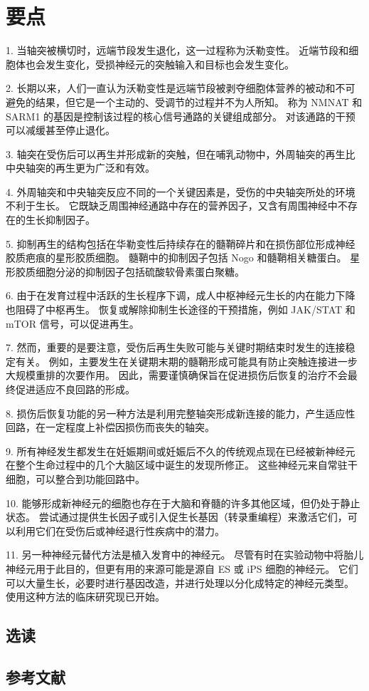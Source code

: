 \section{要点}

1. 当轴突被横切时，远端节段发生退化，这一过程称为沃勒变性。 近端节段和细胞体也会发生变化，受损神经元的突触输入和目标也会发生变化。 

2. 长期以来，人们一直认为沃勒变性是远端节段被剥夺细胞体营养的被动和不可避免的结果，但它是一个主动的、受调节的过程并不为人所知。 称为 NMNAT 和 SARM1 的基因是控制该过程的核心信号通路的关键组成部分。 对该通路的干预可以减缓甚至停止退化。 

3. 轴突在受伤后可以再生并形成新的突触，但在哺乳动物中，外周轴突的再生比中央轴突的再生更为广泛和有效。 

4. 外周轴突和中央轴突反应不同的一个关键因素是，受伤的中央轴突所处的环境不利于生长。 它既缺乏周围神经通路中存在的营养因子，又含有周围神经中不存在的生长抑制因子。 

5. 抑制再生的结构包括在华勒变性后持续存在的髓鞘碎片和在损伤部位形成神经胶质疤痕的星形胶质细胞。 髓鞘中的抑制因子包括 Nogo 和髓鞘相关糖蛋白。 星形胶质细胞分泌的抑制因子包括硫酸软骨素蛋白聚糖。 

6. 由于在发育过程中活跃的生长程序下调，成人中枢神经元生长的内在能力下降也阻碍了中枢再生。 恢复或解除抑制生长途径的干预措施，例如 JAK/STAT 和 mTOR 信号，可以促进再生。 

7. 然而，重要的是要注意，受伤后再生失败可能与关键时期结束时发生的连接稳定有关。 例如，主要发生在关键期末期的髓鞘形成可能具有防止突触连接进一步大规模重排的次要作用。 因此，需要谨慎确保旨在促进损伤后恢复的治疗不会最终促进适应不良回路的形成。 

8. 损伤后恢复功能的另一种方法是利用完整轴突形成新连接的能力，产生适应性回路，在一定程度上补偿因损伤而丧失的轴突。 

9. 所有神经发生都发生在妊娠期间或妊娠后不久的传统观点现在已经被新神经元在整个生命过程中的几个大脑区域中诞生的发现所修正。 这些神经元来自常驻干细胞，可以整合到功能回路中。 

10. 能够形成新神经元的细胞也存在于大脑和脊髓的许多其他区域，但仍处于静止状态。 尝试通过提供生长因子或引入促生长基因（转录重编程）来激活它们，可以利用它们在受伤后或神经退行性疾病中的潜力。 

11. 另一种神经元替代方法是植入发育中的神经元。 尽管有时在实验动物中将胎儿神经元用于此目的，但更有用的来源可能是源自 ES 或 iPS 细胞的神经元。 它们可以大量生长，必要时进行基因改造，并进行处理以分化成特定的神经元类型。 使用这种方法的临床研究现已开始。
\subsection{选读}
\subsection{参考文献}

